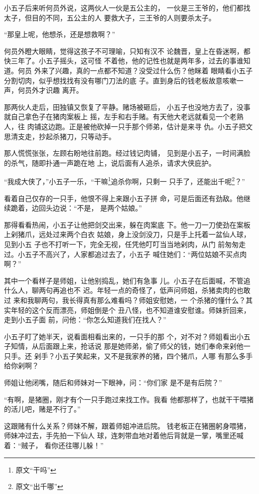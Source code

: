 小五子后来听何员外说，这两伙人一伙是五公主的，
一伙是三王爷的，他们都找太子，但目的不同，五公主的人
要救大子，三王爷的人则要杀太子。

“那皇上呢，他想杀，还是想救啊？”

何员外瞪大眼睛，觉得这孩子不可理喻，只知有汉不
论魏晋，皇上在昏迷啊，都快三年了。小五子摇头，这可怪
不着他，他的记性也就是两年多，过去的事谁知道。何员
外来了兴趣，真的一点都不知道？没受过什么伤？他眯着
眼睛看小五子分割切肉，似乎想找找有没有哪门刀法的底
子。直到身后的钱老板故意咳嗽一声，何员外才识趣
离开。

那两伙人走后，田独镇又恢复了平静。赌场被砸后，
小五子也没地方去了，没事就自己拿色子在猪肉案板上
摇，左手和右手赌。有天他大老远就看见一个老熟人，往
肉铺这边跑。正是被他砍掉一只手那个师弟，估计是来寻
仇。小五子把文思清支走，抄起杀猪刀，只等动手。

那人慌慌张张，左顾右盼地往前跑。经过钱记肉铺，
见到是小五子，一时间满脸的杀气，随即扑通一声跪在地
上，说后面有人追杀，请求大侠庇护。

“我成大侠了，”小五子一乐，“干嘛\footnote{原文“干吗”}追杀你啊，只剩一
只手了，还能出千呢\footnote{原文“出千哪”}？”

看着自己仅存的一只手，他恨不得上来跟小五子拼
命，可是后面还有劲敌。他继续跪着，边回头边说：“不是，
是两个姑娘。”

那得看看热闹，小五子让他把剑交出来，躲在肉案底
下。他一刀一刀使劲在案板上剁猪爪，远处过来两个白衣
姑娘，身上没剑没刀，只是手上托着一盆仙人球，见到小五
子也不打听一下，完全无视，任凭他叮叮当当地剁肉，从门
前匆匆走过。小五子不高兴了，人家都追过去了，小五子
喊住她们：“两位姑娘不买点肉啊？”

其中一个看样子是师姐，让他别捣乱，她们有急事
儿。小五子在后面喊，不管追什么人，聊两句再追也不
迟。年轻一点的奇怪了，低声问师姐，杀猪卖肉的也敢过
来和我聊两句，我长得真有那么难看吗？师姐安慰她，一
个杀猪的懂什么？其实年轻的这个反而漂亮，师姐倒是个
丑八怪，也不知道谁安慰谁。师妹折回来，走到小五子面
前，问他：“你怎么知道我们在找人？”

小五子盯了她半天，说看面相看出来的，一只手的那
个，对不对？师姐看出小五子知情，从后面跟上来，抢话说
那是她师弟，偷了师父的钱，她们奉命来剁他一只手。还
剁手？小五子笑起来，又不是我家养的猪，四个猪爪，人哪
有那么多手给你剁啊？

师姐让他闭嘴，随后和师妹对一下眼神，问：“你们家
是不是有后院？”

“有啊，是猪圈，刚才有个一只手跑过来找工作。我看
他都那样了，也就干干喂猪的活儿吧，赌是不行了。”

这跟赌有什么关系？师妹不解，跟着师姐冲进后院。
钱老板正在猪圈躬身喂猪，师妹冲过去，手先拍一下仙人
球，连刺带血地对着他后背就是一掌，嘴里还喊着：“贼子，
看你还往哪儿躲！”

